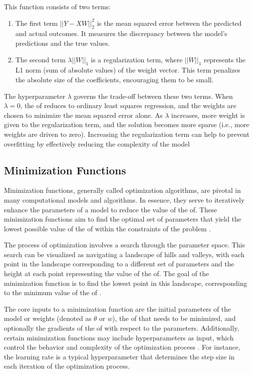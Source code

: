 \documentclass[
  a4paper,  %
  twoside,  %
  bibliography=totoc,
  headsepline,
  cleardoublepage=empty,
  parskip=half,
  draft=false
]{scrbook}
\begin{document}
This function consists of two terms:
\begin{enumerate}
  \item The first term \(||Y - XW||^2_2\) is the mean squared error between the predicted and actual outcomes.
  It measures the discrepancy between the model's predictions and the true values.
  \item The second term \(\lambda ||W||_1\) is a regularization term, where \(||W||_1\) represents the L1 norm (sum of absolute values) of the weight vector.
  This term penalizes the absolute size of the coefficients, encouraging them to be small.
\end{enumerate}
The hyperparameter \(\lambda\) governs the trade-off between these two terms.
When \(\lambda = 0\), the \gls{of} reduces to ordinary least squares regression, and the weights are chosen to minimize the mean squared error alone.
As \(\lambda\) increases, more weight is given to the regularization term, and the solution becomes more sparse (i.e., more weights are driven to zero).
Increasing the regularization term can help to prevent overfitting by effectively reducing the complexity of the model \cite{ShalevShwartz2014}

\subsection{Minimization Functions}
\label{subsec:minimizationFunctions}
Minimization functions, generally called optimization algorithms, are pivotal in many computational models and algorithms.
In essence, they serve to iteratively enhance the parameters of a model to reduce the value of the \gls{of}.
These minimization functions aim to find the optimal set of parameters that yield the lowest possible value of the \gls{of} within the constraints of the problem \cite{Nocedal2006}.

The process of optimization involves a search through the parameter space.
This search can be visualized as navigating a landscape of hills and valleys, with each point in the landscape corresponding to a different set of parameters and the height at each point representing the value of the \gls{of}.
The goal of the minimization function is to find the lowest point in this landscape, corresponding to the minimum value of the \gls{of} \cite{Goodfellow2017}.

The core inputs to a minimization function are the initial parameters of the model or weights (denoted as \(\theta\) or \(w\)),
the \gls{of} that needs to be minimized, and optionally the gradients of the \gls{of} with respect to the parameters.
Additionally, certain minimization functions may include hyperparameters as input, which control the behavior and complexity of the optimization process \cite{Virtanen2020}.
For instance, the learning rate is a typical hyperparameter that determines the step size in each iteration of the optimization process.
\end{document}
